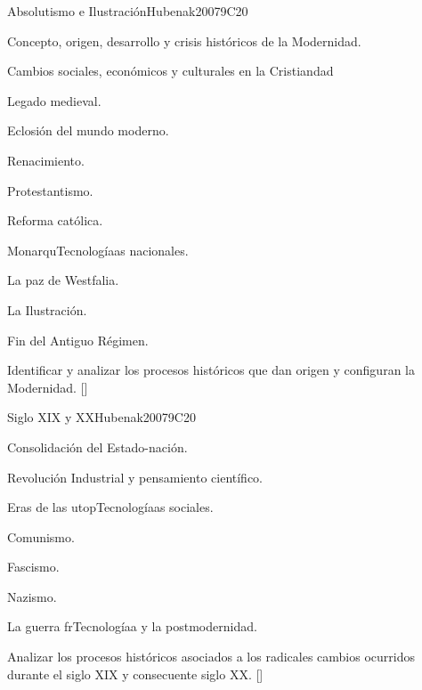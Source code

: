 \begin{syllabus}
\begin{unit}{}{Absolutismo e Ilustración}{Hubenak2007}{9}{C20}
\begin{topics}
	\item Concepto, origen, desarrollo y crisis históricos de la Modernidad.
	\item Cambios sociales, económicos y culturales en la Cristiandad
	      \begin{subtopics}
		\item Legado medieval.
		\item Eclosión del mundo moderno.
	      \end{subtopics}
	\item Renacimiento.
	\item Protestantismo.
	\item Reforma católica.
	\item MonarquTecnologíaas nacionales.
	\item La paz de Westfalia.
	\item La Ilustración.
	\item Fin del Antiguo Régimen.
\end{topics}
\begin{learningoutcomes}
	\item Identificar y analizar los procesos históricos que dan origen y configuran la Modernidad. [\Familiarity]
\end{learningoutcomes}
\end{unit}

\begin{unit}{}{Siglo XIX y XX}{Hubenak2007}{9}{C20}
\begin{topics}
	\item Consolidación del Estado-nación.
	\item Revolución Industrial y pensamiento científico.
	\item Eras de las utopTecnologíaas sociales.
	      \begin{subtopics}
		\item Comunismo.
		\item Fascismo.
		\item Nazismo.
	      \end{subtopics}
	\item La guerra frTecnologíaa y la postmodernidad.
\end{topics}
\begin{learningoutcomes}
	\item Analizar los procesos históricos asociados a los radicales cambios ocurridos durante el siglo XIX y consecuente siglo XX. [\Familiarity]
\end{learningoutcomes}
\end{unit}


\end{syllabus}
